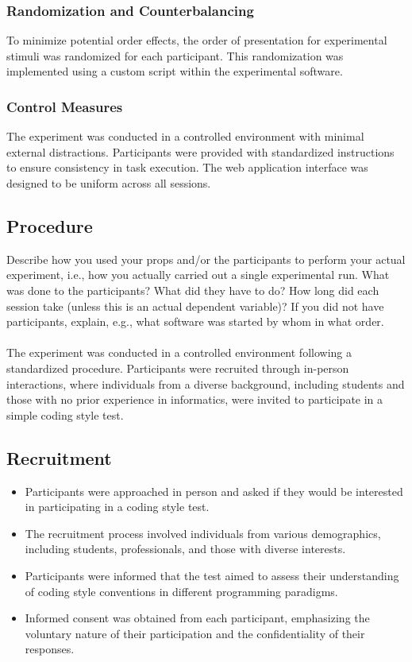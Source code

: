 \documentclass{article}
\begin{document}
\subsubsection*{Randomization and Counterbalancing}
To minimize potential order effects, the order of presentation for experimental stimuli was randomized for each participant. This randomization was implemented using a custom script within the experimental software.

\subsubsection*{Control Measures}
The experiment was conducted in a controlled environment with minimal external distractions. Participants were provided with standardized instructions to ensure consistency in task execution. The web application interface was designed to be uniform across all sessions.


\subsection{Procedure}
Describe how you used your props and/or the participants to perform your actual experiment, i.e., how you actually carried out a single experimental run. What was done to the participants? What did they have to do? How long did each session take (unless this is an actual dependent variable)? If you did not have participants, explain, e.g., what software was started by whom in what order.\\\\
The experiment was conducted in a controlled environment following a standardized procedure. Participants were recruited through in-person interactions, where individuals from a diverse background, including students and those with no prior experience in informatics, were invited to participate in a simple coding style test.

\subsection*{Recruitment}

\begin{itemize}
  \item Participants were approached in person and asked if they would be interested in participating in a coding style test.
  \item The recruitment process involved individuals from various demographics, including students, professionals, and those with diverse interests.
  \item Participants were informed that the test aimed to assess their understanding of coding style conventions in different programming paradigms.
  \item Informed consent was obtained from each participant, emphasizing the voluntary nature of their participation and the confidentiality of their responses.
\end{itemize}
\end{document}
